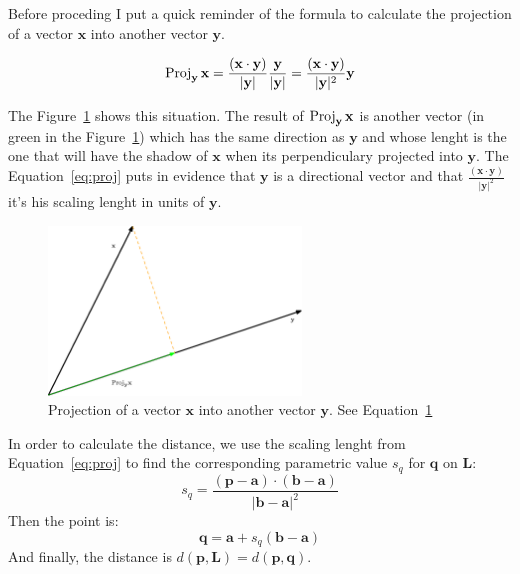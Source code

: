 Before proceding I put a quick reminder of the formula to calculate the projection of a vector $\mathbf{x}$ into another vector $\mathbf{y}$. 

\begin{equation}
\operatorname{Proj}_{\mathbf{y}}\mathbf{x} = \dfrac{(\mathbf{x} \cdot \mathbf{y})}{|\mathbf{y}|} \dfrac{\mathbf{y}}{|\mathbf{y}|} = \dfrac{(\mathbf{x} \cdot \mathbf{y})}{|\mathbf{y}|^2}\mathbf{y}
\label{eq:proj}
\end{equation}

The Figure~\ref{fig:projection} shows this situation.
The result of $\operatorname{Proj}_{\mathbf{y}}\mathbf{x}$ is another vector (in green in the Figure~\ref{fig:projection}) which has the same direction as $\mathbf{y}$ and whose lenght is the one that will have the shadow of $\mathbf{x}$ when its perpendiculary projected into $\mathbf{y}$.
The Equation~\ref{eq:proj} puts in evidence that $\mathbf{y}$ is a directional vector and that $\frac{(\mathbf{x} \cdot \mathbf{y})}{|\mathbf{y}|^2}$ it's his scaling lenght in units of $\mathbf{y}$.

\begin{figure}[htb]
  \centering
  \includegraphics[width=0.60\textwidth]{img/projection}
  \caption{Projection of a vector $\mathbf{x}$ into another vector $\mathbf{y}$. See Equation~\ref{fig:projection}}
  \label{fig:projection}
\end{figure}

In order to calculate the distance, we use the scaling lenght from Equation~\ref{eq:proj} to find the corresponding parametric value $s_q$ for $\mathbf{q}$ on $\mathbf{L}$: 
\begin{equation}
s_q = \dfrac{(\mathbf{p} - \mathbf{a}) \cdot (\mathbf{b} - \mathbf{a})}{|\mathbf{b} - \mathbf{a}|^2}
\label{eq:scalarq}
\end{equation}
Then the point is:
\begin{equation}
\mathbf{q} = \mathbf{a} + s_q (\mathbf{b} -\mathbf{a})
\label{eq:pointq}
\end{equation}
And finally, the distance is $d(\mathbf{p}, \mathbf{L}) = d(\mathbf{p}, \mathbf{q})$.

